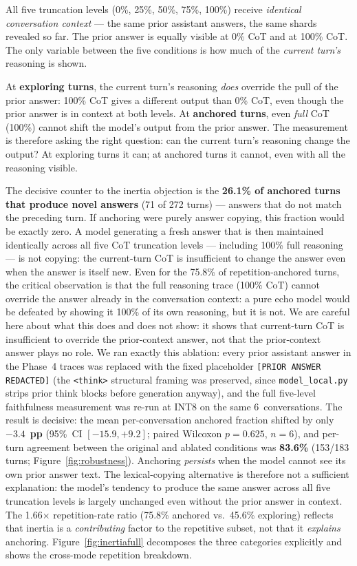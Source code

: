 \documentclass{article}
\begin{document}
All five truncation levels (0\%, 25\%, 50\%, 75\%, 100\%)
receive \emph{identical conversation context} --- the same prior
assistant answers, the same shards revealed so far.
The prior answer is equally visible at 0\% CoT and at 100\% CoT.
The only variable between the five conditions is how much of the
\emph{current turn's} reasoning is shown.

At \textbf{exploring turns}, the current turn's reasoning
\emph{does} override the pull of the prior answer: 100\% CoT
gives a different output than 0\% CoT, even though the prior
answer is in context at both levels.
At \textbf{anchored turns}, even \emph{full} CoT (100\%) cannot
shift the model's output from the prior answer.
The measurement is therefore asking the right question: can the
current turn's reasoning change the output?
At exploring turns it can; at anchored turns it cannot, even with
all the reasoning visible.

The decisive counter to the inertia objection is the
\textbf{26.1\% of anchored turns that produce novel answers}
(71 of 272 turns)
--- answers that do not match the preceding turn.
If anchoring were purely answer copying, this fraction would be
exactly zero.
A model generating a fresh answer that is then maintained
identically across all five CoT truncation levels --- including
100\% full reasoning --- is not copying: the current-turn CoT is
insufficient to change the answer even when the answer is itself
new.
Even for the 75.8\% of repetition-anchored turns, the critical
observation is that the full reasoning trace (100\% CoT) cannot
override the answer already in the conversation context: a pure
echo model would be defeated by showing it 100\% of its own
reasoning, but it is not.
We are careful here about what this does and does not show:
it shows that current-turn CoT is insufficient to override the
prior-context answer, not that the prior-context answer plays no
role.
We ran exactly this ablation: every prior assistant answer in the
Phase~4 traces was replaced with the fixed placeholder
\texttt{[PRIOR ANSWER REDACTED]} (the \texttt{<think>} structural
framing was preserved, since \texttt{model\_local.py} strips prior
think blocks before generation anyway), and the full five-level
faithfulness measurement was re-run at INT8 on the same
6~conversations.
The result is decisive: the mean per-conversation anchored fraction
shifted by only $\mathbf{-3.4}$~\textbf{pp}
(95\%~CI $[-15.9, +9.2]$; paired Wilcoxon $p=0.625$, $n=6$),
and per-turn agreement between the original and ablated conditions
was \textbf{83.6\%} (153/183 turns; Figure~\ref{fig:robustness}).
Anchoring \emph{persists} when the model cannot see its own prior
answer text.
The lexical-copying alternative is therefore not a sufficient
explanation: the model's tendency to produce the same answer across
all five truncation levels is largely unchanged even without the
prior answer in context.
The 1.66$\times$ repetition-rate ratio (75.8\% anchored vs.\
45.6\% exploring) reflects that inertia is a \emph{contributing}
factor to the repetitive subset, not that it \emph{explains} anchoring.
Figure~\ref{fig:inertiafull} decomposes the three categories explicitly and shows the cross-mode repetition breakdown.
\end{document}
